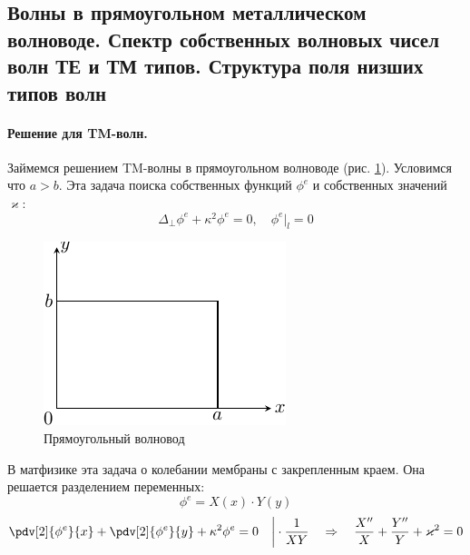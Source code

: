 
\subsection{Волны в прямоугольном металлическом волноводе. Спектр собственных волновых чисел волн ТЕ и ТМ типов. Структура поля низших типов волн}


\paragraph{Решение для TM-волн.} Займемся решением TM-волны в прямоугольном волноводе (рис. \ref{fig:lect4:7}). Условимся что $a>b$. Эта задача поиска собственных функций $\phi^e$ и собственных значений $\varkappa$:
\begin{equation}
	\Delta_\perp \phi^e+\kappa^2\phi^e=0, \quad \phi^e|_l=0
\end{equation}

\begin{figure}[h!]
	\centering
	\includegraphics[scale=1.5]{img/lect4_ris7}
	\caption{Прямоугольный волновод}
	\label{fig:lect4:7}
\end{figure}

В матфизике эта задача о колебании мембраны с закрепленным краем. Она решается разделением переменных:
\begin{equation}
	\phi^e=X(x)\cdot Y(y)
\end{equation}
\begin{equation}
	\pdv[2]{\phi^e}{x}
		+\pdv[2]{\phi^e}{y}
			+\kappa^2 \phi^e =0  \quad \bigg| \cdot \frac{1}{XY}
	\quad \Rightarrow \quad
		\frac{X''}{X}+\frac{Y''}{Y}+\varkappa^2=0
\end{equation}

